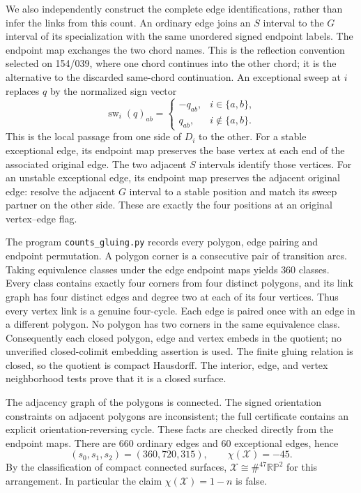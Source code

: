 We also independently construct the complete edge identifications,
rather than infer the links from this count. An ordinary edge joins
an $S$ interval to the $G$ interval of its specialization with the
same unordered signed endpoint labels. The endpoint map exchanges
the two chord names. This is the reflection convention selected on
154/039, where one chord continues into the other chord; it is the
alternative to the discarded same-chord continuation. An exceptional
sweep at $i$ replaces $q$ by the normalized sign vector
\[
 \operatorname{sw}_i(q)_{ab}=
 \begin{cases}
   -q_{ab},&i\in\{a,b\},\\
   q_{ab},&i\notin\{a,b\}.
 \end{cases}                                  \tag{C.5}
\]
This is the local passage from one side of $D_i$ to the other.
For a stable exceptional edge, its endpoint map preserves the base
vertex at each end of the associated original edge. The two
adjacent $S$ intervals identify those vertices. For an unstable
exceptional edge, its endpoint map preserves the adjacent original
edge: resolve the adjacent $G$ interval to a stable position and
match its sweep partner on the other side. These are exactly the
four positions at an original vertex--edge flag.

The program \texttt{counts\_gluing.py} records every polygon, edge
pairing and endpoint permutation. A polygon corner is a consecutive
pair of transition arcs. Taking equivalence classes under the edge
endpoint maps yields $360$ classes. Every class contains exactly
four corners from four distinct polygons, and its link graph has
four distinct edges and degree two at each of its four vertices.
Thus every vertex link is a genuine four-cycle. Each edge is
paired once with an edge in a different polygon. No polygon has
two corners in the same equivalence class. Consequently each
closed polygon, edge and vertex embeds in the quotient; no
unverified closed-colimit embedding assertion is used. The finite
gluing relation is closed, so the quotient is compact Hausdorff.
The interior, edge, and vertex neighborhood tests prove that it is
a closed surface.

The adjacency graph of the polygons is connected. The signed
orientation constraints on adjacent polygons are inconsistent;
the full certificate contains an explicit orientation-reversing
cycle. These facts are checked directly from the endpoint maps.
There are $660$ ordinary edges and $60$ exceptional edges, hence
\[
 (s_0,s_1,s_2)=(360,720,315),\qquad
 \chi(\mathcal X)=-45.
\]
By the classification of compact connected surfaces,
$\mathcal X\cong\#^{47}\mathbb{RP}^2$ for this arrangement.
In particular the claim $\chi(\mathcal X)=1-n$ is false.


